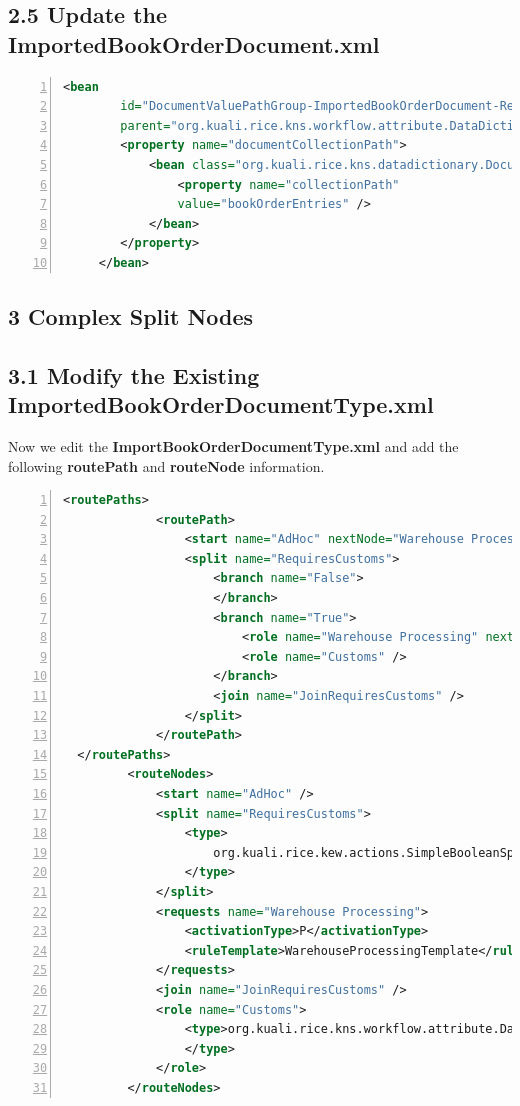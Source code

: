 \subsection*{2.5 Update the ImportedBookOrderDocument.xml}
\begin{lstlisting}[numbers=left,language=xml,basicstyle=\scriptsize,backgroundcolor=\color{ubergray},caption={ImportBookOrderDocument.xml},frame=single,breaklines=true]
	<bean
		id="DocumentValuePathGroup-ImportedBookOrderDocument-RequiresCustoms-bookOrderEntries"
		parent="org.kuali.rice.kns.workflow.attribute.DataDictionaryQualifierResolver">
		<property name="documentCollectionPath">
			<bean class="org.kuali.rice.kns.datadictionary.DocumentCollectionPath">
				<property name="collectionPath"
                value="bookOrderEntries" />
            </bean>
        </property>
     </bean>

\end{lstlisting}

\subsection*{3 Complex Split Nodes}

\subsection*{3.1 Modify the Existing ImportedBookOrderDocumentType.xml}

Now we edit the \textbf{ImportBookOrderDocumentType.xml} and add the
following \textbf{routePath} and \textbf{routeNode} information.
\begin{lstlisting}[numbers=left,language=xml,basicstyle=\scriptsize,backgroundcolor=\color{ubergray},caption={ImportBookOrderDocumentType.xml},frame=single,breaklines=true]
 <routePaths>
   			 <routePath>
   				 <start name="AdHoc" nextNode="Warehouse Processing" />
   				 <split name="RequiresCustoms"> 
                     <branch name="False">  
                     </branch> 
                     <branch name="True">
     				     <role name="Warehouse Processing" nextNode="Customs" />
     				     <role name="Customs" />
   				     </branch> 
                     <join name="JoinRequiresCustoms" /> 
                 </split>
   			 </routePath>
  </routePaths>
   		 <routeNodes>
   			 <start name="AdHoc" />
   			 <split name="RequiresCustoms">
   				 <type>
   					 org.kuali.rice.kew.actions.SimpleBooleanSplitNode
   				 </type>
   			 </split>
   			 <requests name="Warehouse Processing">
   				 <activationType>P</activationType>
   				 <ruleTemplate>WarehouseProcessingTemplate</ruleTemplate>
   			 </requests>
   			 <join name="JoinRequiresCustoms" />
   			 <role name="Customs">
   				 <type>org.kuali.rice.kns.workflow.attribute.DataDictionaryQualifierResolver
   				 </type>
   			 </role>
         </routeNodes>
\end{lstlisting}

